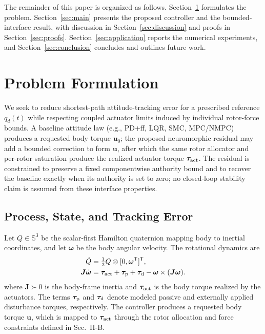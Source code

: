 \documentclass[letterpaper, 10 pt, conference]{ieeeconf}
\newcommand{\T}{^{\mathsf T}}
\begin{document}

The remainder of this paper is organized as follows. Section~\ref{sec:problem} formulates the problem. Section~\ref{sec:main} presents the proposed controller and the bounded-interface result, with discussion in Section~\ref{sec:discussion} and proofs in Section~\ref{sec:proofs}. Section~\ref{sec:application} reports the numerical experiments, and Section~\ref{sec:conclusion} concludes and outlines future work.

\section{Problem Formulation}
\label{sec:problem}
We seek to reduce shortest-path attitude-tracking error for a prescribed reference $q_d(t)$ while respecting coupled actuator limits induced by individual rotor-force bounds. A baseline attitude law (e.g., PD+ff, LQR, SMC, MPC/NMPC) produces a requested body torque $\bm u_0$; the proposed neuromorphic residual may add a bounded correction to form $\bm u$, after which the same rotor allocator and per-rotor saturation produce the realized actuator torque $\bm\tau_{\rm act}$. The residual is constrained to preserve a fixed componentwise authority bound and to recover the baseline exactly when its authority is set to zero; no closed-loop stability claim is assumed from these interface properties.

\subsection{Process, State, and Tracking Error}

Let $Q\in\mathbb S^3$ be the scalar-first Hamilton quaternion mapping body to
inertial coordinates, and let $\bm\omega$ be the body angular velocity. The
rotational dynamics are \cite{schaub2018amss}
\begin{align}
 \dot Q&=\tfrac12 Q\otimes[0,\bm\omega\T]\T,\\
 \bm J\dot{\bm\omega}&=\bm\tau_{\rm act}+\bm\tau_{\rm p}
       +\bm\tau_{\rm d}-\bm\omega\times(\bm J\bm\omega).
 \label{eq:plant}
\end{align}
where $\bm J\succ0$ is the body-frame inertia and
$\bm\tau_{\rm act}$ is the body torque realized by the actuators.
The terms $\bm\tau_{\rm p}$ and $\bm\tau_{\rm d}$ denote modeled
passive and externally applied disturbance torques, respectively.
The controller produces a requested body torque $\bm u$, which is
mapped to $\bm\tau_{\rm act}$ through the rotor allocation and force
constraints defined in Sec.~II-B.
\end{document}
